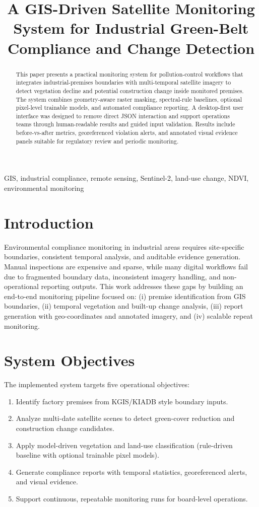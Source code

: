 \documentclass[conference]{IEEEtran}
\title{A GIS-Driven Satellite Monitoring System for Industrial Green-Belt Compliance and Change Detection}
\author{\IEEEauthorblockN{Rakshit Verma}
\IEEEauthorblockA{Independent Research and Development\\
Email: rakshit@example.com}
}
\begin{document}
\maketitle

\begin{abstract}
This paper presents a practical monitoring system for pollution-control workflows that integrates industrial-premises boundaries with multi-temporal satellite imagery to detect vegetation decline and potential construction change inside monitored premises. The system combines geometry-aware raster masking, spectral-rule baselines, optional pixel-level trainable models, and automated compliance reporting. A desktop-first user interface was designed to remove direct JSON interaction and support operations teams through human-readable results and guided input validation. Results include before-vs-after metrics, georeferenced violation alerts, and annotated visual evidence panels suitable for regulatory review and periodic monitoring.
\end{abstract}

\begin{IEEEkeywords}
GIS, industrial compliance, remote sensing, Sentinel-2, land-use change, NDVI, environmental monitoring
\end{IEEEkeywords}

\section{Introduction}
Environmental compliance monitoring in industrial areas requires site-specific boundaries, consistent temporal analysis, and auditable evidence generation. Manual inspections are expensive and sparse, while many digital workflows fail due to fragmented boundary data, inconsistent imagery handling, and non-operational reporting outputs. This work addresses these gaps by building an end-to-end monitoring pipeline focused on: (i) premise identification from GIS boundaries, (ii) temporal vegetation and built-up change analysis, (iii) report generation with geo-coordinates and annotated imagery, and (iv) scalable repeat monitoring.

\section{System Objectives}
The implemented system targets five operational objectives:
\begin{enumerate}
    \item Identify factory premises from KGIS/KIADB style boundary inputs.
    \item Analyze multi-date satellite scenes to detect green-cover reduction and construction change candidates.
    \item Apply model-driven vegetation and land-use classification (rule-driven baseline with optional trainable pixel models).
    \item Generate compliance reports with temporal statistics, georeferenced alerts, and visual evidence.
    \item Support continuous, repeatable monitoring runs for board-level operations.
\end{enumerate}
\end{document}
